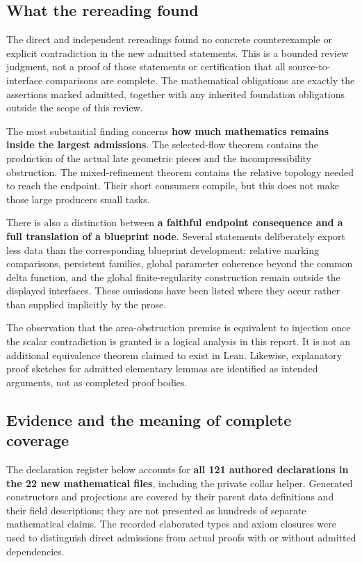 \documentclass[
  letterpaper,
  11pt]{article}
\begin{document}
\subsection{What the rereading found}\label{review-findings}

The direct and independent rereadings found no concrete counterexample
or explicit contradiction in the new admitted statements. This is a
bounded review judgment, not a proof of those statements or
certification that all source-to-interface comparisons are complete. The
mathematical obligations are exactly the assertions marked admitted,
together with any inherited foundation obligations outside the scope of
this review.

The most substantial finding concerns \textbf{how much mathematics
remains inside the largest admissions}. The selected-flow theorem
contains the production of the actual late geometric pieces and the
incompressibility obstruction. The mixed-refinement theorem contains the
relative topology needed to reach the endpoint. Their short consumers
compile, but this does not make those large producers small tasks.

There is also a distinction between \textbf{a faithful endpoint
consequence and a full translation of a blueprint node}. Several
statements deliberately export less data than the corresponding
blueprint development: relative marking comparisons, persistent
families, global parameter coherence beyond the common delta function,
and the global finite-regularity construction remain outside the
displayed interfaces. These omissions have been listed where they occur
rather than supplied implicitly by the prose.

The observation that the area-obstruction premise is equivalent to
injection once the scalar contradiction is granted is a logical analysis
in this report. It is not an additional equivalence theorem claimed to
exist in Lean. Likewise, explanatory proof sketches for admitted
elementary lemmas are identified as intended arguments, not as completed
proof bodies.

\subsection{Evidence and the meaning of complete
coverage}\label{report-evidence}

The declaration register below accounts for \textbf{all 121 authored
declarations in the 22 new mathematical files}, including the private
collar helper. Generated constructors and projections are covered by
their parent data definitions and their field descriptions; they are not
presented as hundreds of separate mathematical claims. The recorded
elaborated types and axiom closures were used to distinguish direct
admissions from actual proofs with or without admitted dependencies.
\end{document}
